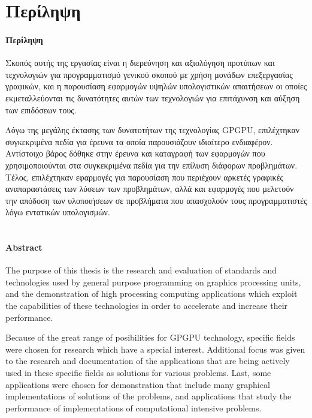 \chapter{Περίληψη}
\subsubsection{Περίληψη}
Σκοπός αυτής της εργασίας είναι η διερεύνηση και αξιολόγηση προτύπων και τεχνολογιών για προγραμματισμό γενικού σκοπού με χρήση μονάδων επεξεργασίας γραφικών, και η παρουσίαση εφαρμογών υψηλών υπολογιστικών απαιτήσεων οι οποίες εκμεταλλεύονται τις δυνατότητες αυτών των τεχνολογιών για επιτάχυνση και αύξηση των επιδόσεων τους. 

Λόγω της μεγάλης έκτασης των δυνατοτήτων της τεχνολογίας GPGPU, επιλέχτηκαν συγκεκριμένα πεδία για έρευνα τα οποία παρουσιάζουν ιδιαίτερο ενδιαφέρον. Αντίστοιχο βάρος δόθηκε στην έρευνα και καταγραφή των εφαρμογών που χρησιμοποιούνται στα συγκεκριμένα πεδία για την επίλυση διάφορων προβλημάτων. Τέλος, επιλέχτηκαν εφαρμογές για παρουσίαση που περιέχουν αρκετές γραφικές αναπαραστάσεις των λύσεων των προβλημάτων, αλλά και εφαρμογές που μελετούν την απόδοση των υλοποιήσεων σε προβλήματα που απασχολούν τους προγραμματιστές λόγω εντατικών υπολογισμών.
\\
\\
\subsubsection{Abstract}
The purpose of this thesis is the research and evaluation of standards and technologies used by general purpose programming on graphics processing units, and the demonstration of high processing computing applications which exploit the capabilities of these technologies in order to accelerate and increase their performance.

Because of the great range of posibilities for GPGPU technology, specific fields were chosen for research which have a special interest. Additional focus was given to the research and documentation of the applications that are being actively used in these specific fields as solutions for various problems. Last, some applications were chosen for demonstration that include many graphical implementations of solutions of the problems, and applications that study the performance of implementations of computational intensive problems.

\newpage